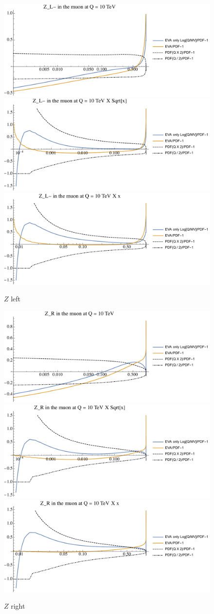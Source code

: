 \documentclass[a4paper,11pt]{article}
\begin{document}
\begin{figure}[!b]
\includegraphics[width=0.46\linewidth]{Notebooks/PlotPDFs/ratios/10TeV/Z_L-_Q.pdf}
\includegraphics[width=0.46\linewidth]{Notebooks/PlotPDFs/ratios/10TeV/Z_L-_Qsqrtx.pdf}
\includegraphics[width=0.46\linewidth]{Notebooks/PlotPDFs/ratios/10TeV/Z_L-_Qx.pdf}
\caption{$Z$ left}
\end{figure}

\begin{figure}[!b]
\includegraphics[width=0.46\linewidth]{Notebooks/PlotPDFs/ratios/10TeV/Z_R_Q.pdf}
\includegraphics[width=0.46\linewidth]{Notebooks/PlotPDFs/ratios/10TeV/Z_R_Qsqrtx.pdf}
\includegraphics[width=0.46\linewidth]{Notebooks/PlotPDFs/ratios/10TeV/Z_R_Qx.pdf}
\caption{$Z$ right}
\end{figure}
\end{document}
